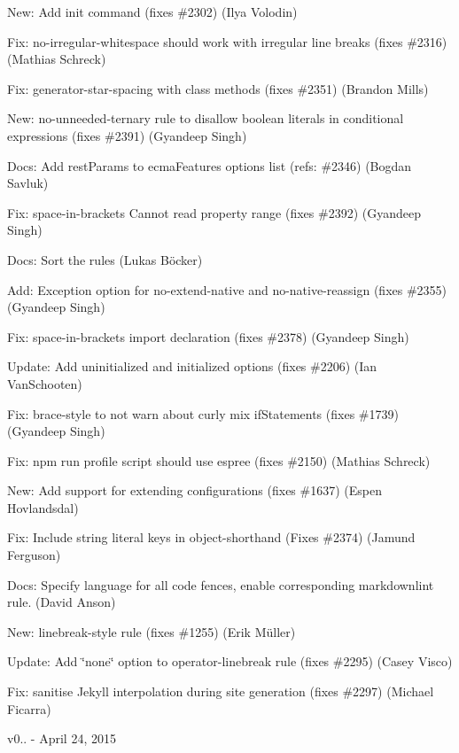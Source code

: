 \begin{DoxyItemize}
\item New\+: Add init command (fixes \#2302) (Ilya Volodin)
\item Fix\+: no-\/irregular-\/whitespace should work with irregular line breaks (fixes \#2316) (Mathias Schreck)
\item Fix\+: generator-\/star-\/spacing with class methods (fixes \#2351) (Brandon Mills)
\item New\+: no-\/unneeded-\/ternary rule to disallow boolean literals in conditional expressions (fixes \#2391) (Gyandeep Singh)
\item Docs\+: Add {\ttfamily rest\+Params} to {\ttfamily ecma\+Features} options list (refs\+: \#2346) (Bogdan Savluk)
\item Fix\+: space-\/in-\/brackets Cannot read property \textquotesingle{}range\textquotesingle{} (fixes \#2392) (Gyandeep Singh)
\item Docs\+: Sort the rules (Lukas Böcker)
\item Add\+: Exception option for {\ttfamily no-\/extend-\/native} and {\ttfamily no-\/native-\/reassign} (fixes \#2355) (Gyandeep Singh)
\item Fix\+: space-\/in-\/brackets import declaration (fixes \#2378) (Gyandeep Singh)
\item Update\+: Add uninitialized and initialized options (fixes \#2206) (Ian Van\+Schooten)
\item Fix\+: brace-\/style to not warn about curly mix if\+Statements (fixes \#1739) (Gyandeep Singh)
\item Fix\+: npm run profile script should use espree (fixes \#2150) (Mathias Schreck)
\item New\+: Add support for extending configurations (fixes \#1637) (Espen Hovlandsdal)
\item Fix\+: Include string literal keys in object-\/shorthand (Fixes \#2374) (Jamund Ferguson)
\item Docs\+: Specify language for all code fences, enable corresponding markdownlint rule. (David Anson)
\item New\+: linebreak-\/style rule (fixes \#1255) (Erik Müller)
\item Update\+: Add \char`\"{}none\char`\"{} option to operator-\/linebreak rule (fixes \#2295) (Casey Visco)
\item Fix\+: sanitise Jekyll interpolation during site generation (fixes \#2297) (Michael Ficarra)
\end{DoxyItemize}

v0.. -\/ April 24, 2015


